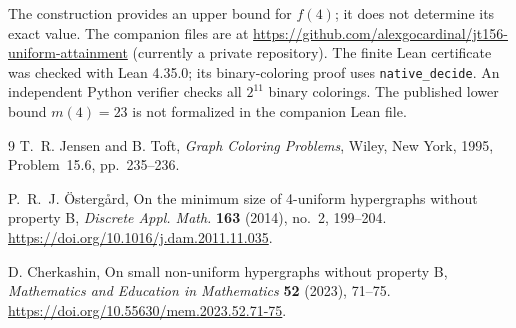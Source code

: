 \documentclass[11pt]{article}
\begin{document}
The construction provides an upper bound for \(f(4)\); it does not determine
its exact value. The companion files are at
\url{https://github.com/alexgocardinal/jt156-uniform-attainment}
(currently a private repository).
The finite Lean certificate was checked with Lean 4.35.0; its binary-coloring
proof uses \texttt{native\_decide}. An independent Python verifier checks all
\(2^{11}\) binary colorings. The published lower bound \(m(4)=23\) is not
formalized in the companion Lean file.

\begin{thebibliography}{9}
T.~R. Jensen and B. Toft,
\emph{Graph Coloring Problems}, Wiley, New York, 1995, Problem~15.6,
pp.~235--236.

P.~R.~J. \"Osterg\r{a}rd,
On the minimum size of 4-uniform hypergraphs without property B,
\emph{Discrete Appl. Math.} \textbf{163} (2014), no.~2, 199--204.
\url{https://doi.org/10.1016/j.dam.2011.11.035}.

D. Cherkashin,
On small non-uniform hypergraphs without property B,
\emph{Mathematics and Education in Mathematics} \textbf{52}
(2023), 71--75.
\url{https://doi.org/10.55630/mem.2023.52.71-75}.
\end{thebibliography}
\end{document}
